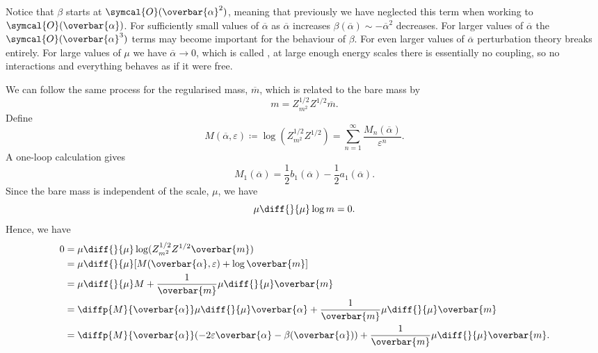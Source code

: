 \documentclass[fleqn]{NotesClass}
\newcommand{\order}{\symcal{O}}
\begin{document}
    Notice that \(\beta\) starts at \(\order(\overbar{\alpha}^2)\), meaning that previously we have neglected this term when working to \(\order(\overbar{\alpha})\).
    For sufficiently small values of \(\overbar{\alpha}\) as \(\overbar{\alpha}\) increases \(\beta(\overbar{\alpha}) \sim -\overbar{\alpha}^2\) decreases.
    For larger values of \(\overbar{\alpha}\) the \(\order(\overbar{\alpha}^3)\) terms may become important for the behaviour of \(\beta\).
    For even larger values of \(\overbar{\alpha}\) perturbation theory breaks entirely.
    For large values of \(\mu\) we have \(\overbar{\alpha} \to 0\), which is called , at large enough energy scales there is essentially no coupling, so no interactions and everything behaves as if it were free.
    
    We can follow the same process for the regularised mass, \(\overbar{m}\), which is related to the bare mass by
    \begin{equation}
        m = Z_{m^2}^{1/2}Z^{1/2}\overbar{m}.
    \end{equation}
    Define
    \begin{equation}
        M(\overbar{\alpha}, \varepsilon) \coloneqq \log(Z_{m^2}^{1/2}Z^{1/2}) = \sum_{n=1}^{\infty} \frac{M_n(\overbar{\alpha})}{\varepsilon^n}.
    \end{equation}
    A one-loop calculation gives
    \begin{equation}
        M_1(\overbar{\alpha}) = \frac{1}{2}b_1(\overbar{\alpha}) - \frac{1}{2}a_1(\overbar{\alpha}).
    \end{equation}
    Since the bare mass is independent of the scale, \(\mu\), we have
    \begin{equation}
        \mu \diff{}{\mu} \log m = 0.
    \end{equation}
    Hence, we have
    \begin{align}
        0 &= \mu\diff{}{\mu} \log(Z_{m^2}^{1/2} Z^{1/2}\overbar{m})\\
        &= \mu \diff{}{\mu} [M(\overbar{\alpha}, \varepsilon) + \log \overbar{m}]\\
        &= \mu \diff{}{\mu} M + \frac{1}{\overbar{m}} \mu\diff{}{\mu} \overbar{m}\\
        &= \diffp{M}{\overbar{\alpha}} \mu \diff{}{\mu}\overbar{\alpha} + \frac{1}{\overbar{m}} \mu \diff{}{\mu} \overbar{m}\\
        &= \diffp{M}{\overbar{\alpha}}(-2\varepsilon\overbar{\alpha} - \beta(\overbar{\alpha})) + \frac{1}{\overbar{m}} \mu \diff{}{\mu} \overbar{m}.
    \end{align}
\end{document}
